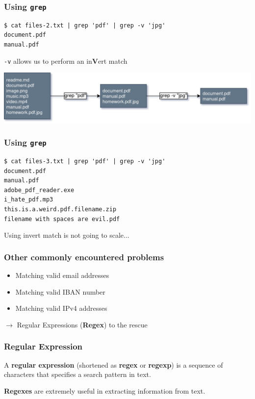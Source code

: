 \documentclass{beamer}
\begin{document}
\begin{frame}[fragile]
\frametitle{Using \texttt{grep}}
\begin{lstlisting}
$ cat files-2.txt | grep 'pdf' | grep -v 'jpg'
document.pdf
manual.pdf
\end{lstlisting}
\begin{center}
    \texttt{-v} allows us to perform an in\textbf{V}ert match
\end{center}
    \begin{center}
    \includegraphics[width=1.0\textwidth]{pics/linux_pipe_diagram.png}
    \end{center}
\end{frame}


\begin{frame}[fragile]
\frametitle{Using \texttt{grep}}
\begin{lstlisting}
$ cat files-3.txt | grep 'pdf' | grep -v 'jpg'
document.pdf
manual.pdf
adobe_pdf_reader.exe
i_hate_pdf.mp3
this.is.a.weird.pdf.filename.zip
filename with spaces are evil.pdf
\end{lstlisting}
\begin{center}
    Using invert match is not going to scale...
\end{center}
\end{frame}

\begin{frame}[fragile]
\frametitle{Other commonly encountered problems}
    \begin{itemize}
        \item Matching valid email addresses
        \item Matching valid IBAN number
        \item Matching valid IPv4 addresses
    \end{itemize}
    \vspace{1em}
    \begin{center}
        $\rightarrow$ Regular Expressions (\textbf{Regex}) to the rescue
    \end{center}
\end{frame}

\begin{frame}[fragile]
    \frametitle{Regular Expression}
    \begin{center}
        A \textbf{regular expression} (shortened as \textbf{regex} or \textbf{regexp}) is a sequence of characters that specifies a search pattern in text.
    \end{center}
    \begin{center}
        \textbf{Regexes} are extremely useful in extracting information from text.
    \end{center}
\end{frame}
\end{document}
